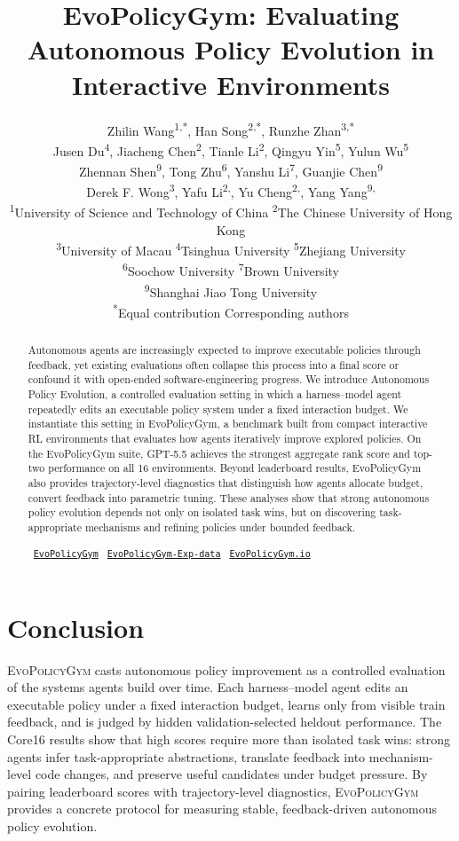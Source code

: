 \documentclass{article}
\title{EvoPolicyGym: Evaluating Autonomous Policy Evolution in Interactive Environments}
\author{%
\begin{minipage}[t]{0.88\textwidth}
\centering
Zhilin Wang\textsuperscript{1,*}, Han Song\textsuperscript{2,*},
Runzhe Zhan\textsuperscript{3,*}\\
Jusen Du\textsuperscript{4}, Jiacheng Chen\textsuperscript{2},
Tianle Li\textsuperscript{2}, Qingyu Yin\textsuperscript{5},
Yulun Wu\textsuperscript{5}\\
Zhennan Shen\textsuperscript{9}, Tong Zhu\textsuperscript{6},
Yanshu Li\textsuperscript{7}, Guanjie Chen\textsuperscript{9} \\
Derek F. Wong\textsuperscript{3}, Yafu Li\textsuperscript{2,\textdagger},
Yu Cheng\textsuperscript{2,\textdagger}, Yang Yang\textsuperscript{9,\textdagger}\\[0.35em]
{\normalfont\small 
\textsuperscript{1}University of Science and Technology of China \quad
\textsuperscript{2}The Chinese University of Hong Kong \\
\textsuperscript{3}University of Macau \quad
\textsuperscript{4}Tsinghua University \quad
\textsuperscript{5}Zhejiang University \\
\textsuperscript{6}Soochow University \quad
\textsuperscript{7}Brown University \\
\textsuperscript{9}Shanghai Jiao Tong University \\
} 
{\normalfont\small \textsuperscript{*}Equal contribution \quad
\textsuperscript{\textdagger}Corresponding authors}
\end{minipage}
}
\newcommand{\evopolicygym}{\textsc{EvoPolicyGym}}
\begin{document}
\maketitle

\begin{abstract}
Autonomous agents are increasingly expected to improve executable policies through feedback, yet existing evaluations often collapse this process into a final score or confound it with open-ended software-engineering progress. 
We introduce Autonomous Policy Evolution, a controlled evaluation setting in which a harness–model agent repeatedly edits an executable policy system under a fixed interaction budget. 
We instantiate this setting in EvoPolicyGym, a benchmark built from compact interactive RL environments that evaluates how agents iteratively improve explored policies.
On the EvoPolicyGym suite, GPT-5.5 achieves the strongest aggregate rank score and top-two performance on all 16 environments. 
Beyond leaderboard results, EvoPolicyGym also provides trajectory-level diagnostics that distinguish how agents allocate budget, convert feedback into parametric tuning. 
These analyses show that strong autonomous policy evolution depends not only on isolated task wins, but on discovering task-appropriate mechanisms and refining policies under bounded feedback.

\begin{center}
\small
\faGithub~\href{https://github.com/Linzwcs/EvoPolicyGym}{\texttt{EvoPolicyGym}}
\qquad
\faDatabase~\href{https://huggingface.co/datasets/linzw/EvoPolicyGym-Exp-data}{\texttt{EvoPolicyGym-Exp-data}}\qquad
\faGlobe~\href{https://linzwcs.github.io/EvoPolicyGym/}{\texttt{EvoPolicyGym.io}}
\end{center}
\end{abstract}








\section{Conclusion}
\evopolicygym{} casts autonomous policy improvement as a controlled evaluation
of the systems agents build over time. Each harness--model agent edits an
executable policy under a fixed interaction budget, learns only from visible
train feedback, and is judged by hidden validation-selected heldout
performance. The Core16 results show that high scores require more than
isolated task wins: strong agents infer task-appropriate abstractions,
translate feedback into mechanism-level code changes, and preserve useful
candidates under budget pressure. By pairing leaderboard scores with
trajectory-level diagnostics, \evopolicygym{} provides a concrete protocol for
measuring stable, feedback-driven autonomous policy evolution.
\end{document}
